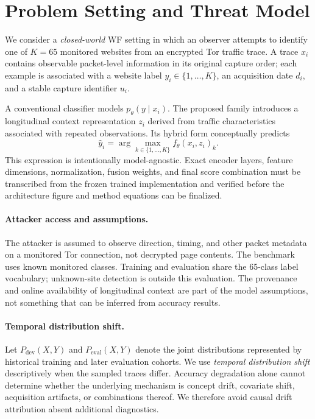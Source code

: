 \section{Problem Setting and Threat Model}\label{sec:threat}
We consider a \emph{closed-world} WF setting in which an observer attempts to identify one of $K=65$ monitored websites from an encrypted Tor traffic trace. A trace $x_i$ contains observable packet-level information in its original capture order; each example is associated with a website label $y_i\in\{1,\ldots,K\}$, an acquisition date $d_i$, and a stable capture identifier $u_i$.

A conventional classifier models $p_\theta(y\mid x_i)$. The proposed family introduces a longitudinal context representation $z_i$ derived from traffic characteristics associated with repeated observations. Its hybrid form conceptually predicts
\begin{equation}
 \hat y_i=\arg\max_{k\in\{1,\dots,K\}} f_{\theta}(x_i,z_i)_k.
 \label{eq:hybrid}
\end{equation}
This expression is intentionally model-agnostic. Exact encoder layers, feature dimensions, normalization, fusion weights, and final score combination must be transcribed from the frozen trained implementation and verified before the architecture figure and method equations can be finalized.

\paragraph{Attacker access and assumptions.} The attacker is assumed to observe direction, timing, and other packet metadata on a monitored Tor connection, not decrypted page contents. The benchmark uses known monitored classes. Training and evaluation share the 65-class label vocabulary; unknown-site detection is outside this evaluation. The provenance and online availability of longitudinal context are part of the model assumptions, not something that can be inferred from accuracy results.

\paragraph{Temporal distribution shift.} Let $P_{\mathrm{dev}}(X,Y)$ and $P_{\mathrm{eval}}(X,Y)$ denote the joint distributions represented by historical training and later evaluation cohorts. We use \emph{temporal distribution shift} descriptively when the sampled traces differ. Accuracy degradation alone cannot determine whether the underlying mechanism is concept drift, covariate shift, acquisition artifacts, or combinations thereof. We therefore avoid causal drift attribution absent additional diagnostics.
